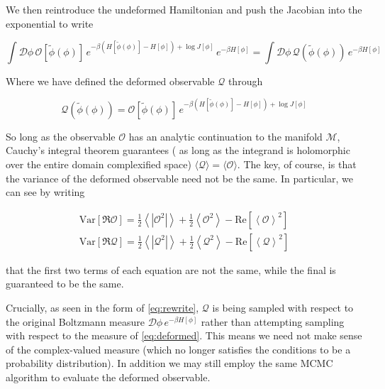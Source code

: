 \documentclass[12pt]{article}
\begin{document}
We then reintroduce the undeformed Hamiltonian and push the Jacobian into the exponential to write

\begin{equation} \label{eq:rewrite}
	\int \mathcal{D}\phi \, \mathcal{O}[\tilde{\phi}(\phi)] \, e^{-\beta \left( H[\tilde{\phi}(\phi)] - H[\phi] \right) + \log J[\phi]}\, e^{-\beta H[\phi]} 
	= \int \mathcal{D}\phi \, \mathcal{Q}(\tilde{\phi}(\phi)) \, e^{-\beta H[\phi]} 
\end{equation}

Where we have defined the deformed observable $\mathcal{Q}$ through

\begin{equation*}
	 \mathcal{Q}(\tilde{\phi}(\phi)) = \mathcal{O}[\tilde{\phi}(\phi)] \, e^{-\beta \left( H[\tilde{\phi}(\phi)] - H[\phi] \right) + \log J[\phi]}
\end{equation*}

So long as the observable $\mathcal{O}$ has an analytic continuation to the manifold $\mathcal{M}$, Cauchy's integral theorem guarantees (
as long as the integrand is holomorphic over the entire domain complexified space)
$\langle \mathcal{Q} \rangle = \langle \mathcal{O} \rangle$. The key, of course, is that the variance of the deformed observable need not be the
same. In particular, we can see by writing

\begin{equation} \label{eq:variances}
	\begin{split}
	\mathrm{Var}[\Re \mathcal{O}] = \frac{1}{2} \left\langle \left| \mathcal{O}^2 \right| \right\rangle + \frac{1}{2} \left\langle \mathcal{O}^2 \right\rangle 
	- \mathrm{Re}\left[ \left\langle \mathcal{O} \right\rangle^2 \right] \\ 
	\mathrm{Var}[\Re \mathcal{Q}] = \frac{1}{2} \left\langle \left| \mathcal{Q}^2 \right| \right\rangle + \frac{1}{2} \left\langle \mathcal{Q}^2 \right\rangle 
	- \mathrm{Re}\left[ \left\langle \mathcal{Q} \right\rangle^2 \right]
	\end{split}
\end{equation}

that the first two terms of each equation are not the same, while the final is guaranteed to be the same.

Crucially, as seen in the form of \ref{eq:rewrite}, $\mathcal{Q}$ is being sampled with respect to the original Boltzmann measure $\mathcal{D}\phi\, e^{-\beta H[\phi]}$
rather than attempting sampling with respect to the measure of \ref{eq:deformed}. This means we need not make sense of the complex-valued measure (which no
longer satisfies the conditions to be a probability distribution). In addition we may still employ the same MCMC algorithm to evaluate the deformed observable.
\end{document}
